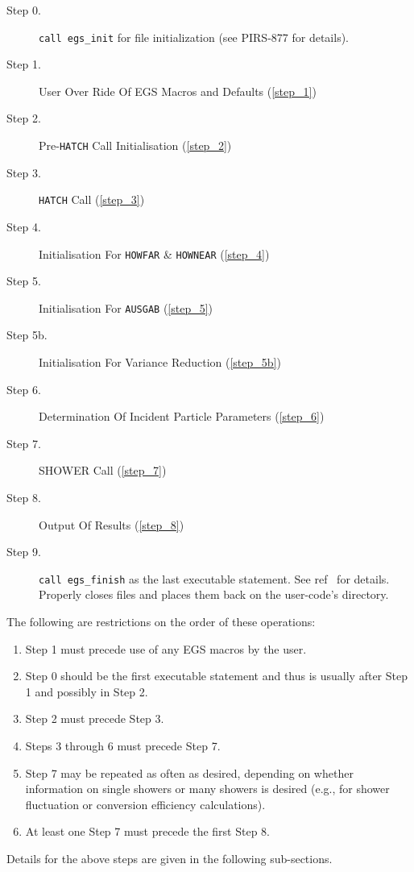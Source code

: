 \begin{description}
\item[Step 0.]  {\tt call egs\_init} for file initialization (see
PIRS-877 for details\cite{Ka03}).
\item[Step 1.]  User Over Ride Of EGS Macros and Defaults (\ref{step_1})
\item[Step 2.]  Pre-{\tt HATCH} Call Initialisation (\ref{step_2})
\item[Step 3.]  {\tt HATCH} Call (\ref{step_3})
\item[Step 4.]  Initialisation For {\tt HOWFAR} \& {\tt HOWNEAR} (\ref{step_4})
\item[Step 5.]  Initialisation For {\tt AUSGAB} (\ref{step_5})
\item[Step 5b.] Initialisation For Variance Reduction (\ref{step_5b})
\item[Step 6.]  Determination Of Incident Particle Parameters
              (\ref{step_6})
\item[Step 7.]  SHOWER Call (\ref{step_7})
\item[Step 8.]  Output Of Results (\ref{step_8})
\item[Step 9.] {\tt call egs\_finish} as the last executable statement. See
ref~\cite{Ka03} for details. Properly closes files and places them back on
the user-code's directory.
\end{description}
\vspace*{-4mm}
 The following are restrictions on the order of these
 operations:
\vspace*{-4mm}
\begin{enumerate}
\item  Step 1 must precede use of any EGS macros by the user.
\item Step 0 should be the first executable statement and thus is usually
after Step 1 and possibly in Step 2.
\item  Step 2 must precede Step 3.
\item Steps 3 through 6 must precede Step 7.
\item Step 7 may be repeated as often as desired, depending on whether
  information on single showers or many showers is desired (e.g., for shower
  fluctuation or conversion efficiency calculations).
\item At least one Step 7 must precede the first Step 8.
\end{enumerate}

Details for the above steps are given in the following sub-sections.

